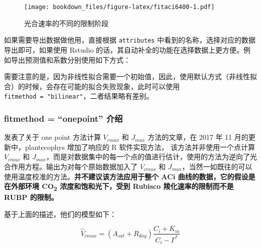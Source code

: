\documentclass[
]{krantz}
\makeatletter
\newenvironment{Shaded}{\begin{snugshade}}{\end{snugshade}}
\newcommand{\CommentTok}[1]{\textcolor[rgb]{0.56,0.35,0.01}{\textit{#1}}}
\newcommand{\DataTypeTok}[1]{\textcolor[rgb]{0.13,0.29,0.53}{#1}}
\newcommand{\KeywordTok}[1]{\textcolor[rgb]{0.13,0.29,0.53}{\textbf{#1}}}
\newcommand{\NormalTok}[1]{#1}
\newcommand{\OperatorTok}[1]{\textcolor[rgb]{0.81,0.36,0.00}{\textbf{#1}}}
\newcommand{\StringTok}[1]{\textcolor[rgb]{0.31,0.60,0.02}{#1}}
\renewenvironment{quote}{\begin{VF}}{\end{VF}}
\newenvironment{kframe}{%
\medskip{}
\setlength{\fboxsep}{.8em}
 \def\at@end@of@kframe{}%
 \ifinner\ifhmode%
  \def\at@end@of@kframe{\end{minipage}}%
  \begin{minipage}{\columnwidth}%
 \fi\fi%
 \def\FrameCommand##1{\hskip\@totalleftmargin \hskip-\fboxsep
 \colorbox{shadecolor}{##1}\hskip-\fboxsep
     \hskip-\linewidth \hskip-\@totalleftmargin \hskip\columnwidth}%
 \MakeFramed {\advance\hsize-\width
   \@totalleftmargin\z@ \linewidth\hsize
   \@setminipage}}%
 {\par\unskip\endMakeFramed%
 \at@end@of@kframe}
\renewenvironment{Shaded}{\begin{kframe}}{\end{kframe}}
\makeatother
\begin{document}
\begin{figure}
\centering
\texttt{[image: bookdown\_files/figure-latex/fitaci6400-1.pdf]}
\caption{\label{fig:fitaci6400}光合速率的不同的限制阶段}
\end{figure}

如果需要导出数据做他用，直接根据 \texttt{attributes} 中看到的名称，选择对应的数据导出即可，如果使用 Rstudio 的话，其自动补全的功能在选择数据上更方便。例如导出预测值和系数分别使用如下方式：

\begin{Shaded}
\end{Shaded}

\begin{quote}
需要注意的是，因为非线性拟合需要一个初始值，因此，使用默认方式（非线性拟合）的时候，会存在可能的拟合失败现象，此时可以使用 \texttt{fitmethod\ =\ "bilinear"}，二者结果略有差别。
\end{quote}

\hypertarget{onepoint}{%
\subsubsection{fitmethod = ``onepoint'' 介绍}\label{onepoint}}

\citet{De2016A} 发表了关于 one point 方法计算 \(V_{cmax}\) 和 \(J_{max}\) 方法的文章，在 2017 年 11 月的更新中，plantecophys 增加了响应的 R 软件实现方法， 该方法并非使用一个点计算 \(V_{cmax}\) 和 \(J_{max}\)，而是对数据集中的每一个点的值进行估计，使用的方法为逆向了光合作用方程。输出为对每个原始数据加入了 \(V_{cmax}\) 和 \(J_{max}\)，当然一如既往的可以使用温度校准的方法。\textbf{并不建议该方法应用于整个 ACi 曲线的数据，它的假设是在外部环境 CO\textsubscript{2} 浓度和饱和光下，受到 Rubisco 羧化速率的限制而不是 RUBP 的限制。}

基于上面的描述，他们的模型如下：

\begin{equation}
\hat{V}_{cmax} = (A_{sat} + R_{day}) \frac{C_i + K_m}{C_i - \Gamma^*} 
\label{eq:inverseA}
\end{equation}
\end{document}
